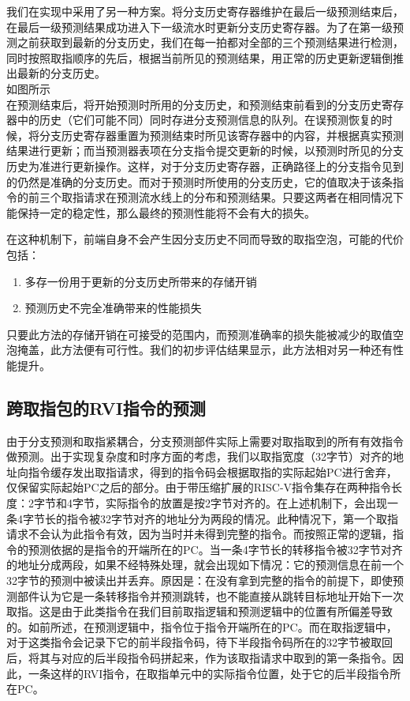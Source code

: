 我们在实现中采用了另一种方案。将分支历史寄存器维护在最后一级预测结束后，在最后一级预测结果成功进入下一级流水时更新分支历史寄存器。为了在第一级预测之前获取到最新的分支历史，我们在每一拍都对全部的三个预测结果进行检测，同时按照取指顺序的先后，根据当前所见的预测结果，用正常的历史更新逻辑倒推出最新的分支历史。\\
如图所示\\
在预测结束后，将开始预测时所用的分支历史，和预测结束前看到的分支历史寄存器中的历史（它们可能不同）同时存进分支预测信息的队列。在误预测恢复的时候，将分支历史寄存器重置为预测结束时所见该寄存器中的内容，并根据真实预测结果进行更新；而当预测器表项在分支指令提交更新的时候，以预测时所见的分支历史为准进行更新操作。这样，对于分支历史寄存器，正确路径上的分支指令见到的仍然是准确的分支历史。而对于预测时所使用的分支历史，它的值取决于该条指令的前三个取指请求在预测流水线上的分布和预测结果。只要这两者在相同情况下能保持一定的稳定性，那么最终的预测性能将不会有大的损失。

在这种机制下，前端自身不会产生因分支历史不同而导致的取指空泡，可能的代价包括：
\begin{enumerate}
    \item 多存一份用于更新的分支历史所带来的存储开销
    \item 预测历史不完全准确带来的性能损失
\end{enumerate}
只要此方法的存储开销在可接受的范围内，而预测准确率的损失能被减少的取值空泡掩盖，此方法便有可行性。我们的初步评估结果显示，此方法相对另一种还有性能提升。

\subsection{跨取指包的RVI指令的预测}
由于分支预测和取指紧耦合，分支预测部件实际上需要对取指取到的所有有效指令做预测。出于实现复杂度和时序方面的考虑，我们以取指宽度（32字节）对齐的地址向指令缓存发出取指请求，得到的指令码会根据取指的实际起始PC进行舍弃，仅保留实际起始PC之后的部分。由于带压缩扩展的RISC-V指令集存在两种指令长度：2字节和4字节，实际指令的放置是按2字节对齐的。在上述机制下，会出现一条4字节长的指令被32字节对齐的地址分为两段的情况。此种情况下，第一个取指请求不会认为此指令有效，因为当时并未得到完整的指令。而按照正常的逻辑，指令的预测依据的是指令的开端所在的PC。当一条4字节长的转移指令被32字节对齐的地址分成两段，如果不经特殊处理，就会出现如下情况：它的预测信息在前一个32字节的预测中被读出并丢弃。原因是：在没有拿到完整的指令的前提下，即使预测部件认为它是一条转移指令并预测跳转，也不能直接从跳转目标地址开始下一次取指。这是由于此类指令在我们目前取指逻辑和预测逻辑中的位置有所偏差导致的。如前所述，在预测逻辑中，指令位于指令开端所在的PC。而在取指逻辑中，对于这类指令会记录下它的前半段指令码，待下半段指令码所在的32字节被取回后，将其与对应的后半段指令码拼起来，作为该取指请求中取到的第一条指令。因此，一条这样的RVI指令，在取指单元中的实际指令位置，处于它的后半段指令所在PC。

